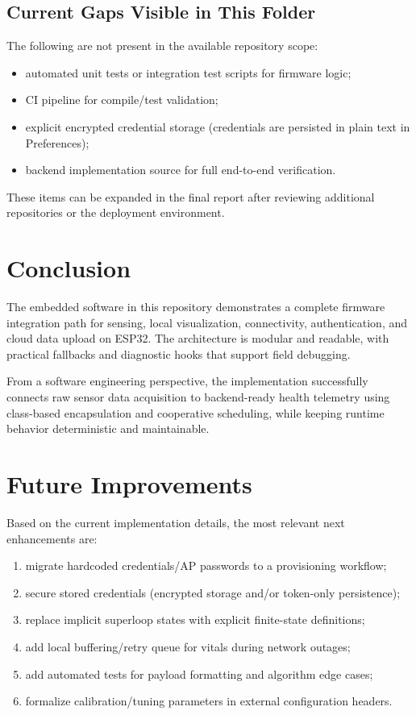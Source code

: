 \documentclass[12pt,a4paper]{report}
\begin{document}
\subsection{Current Gaps Visible in This Folder}
The following are not present in the available repository scope:
\begin{itemize}
  \item automated unit tests or integration test scripts for firmware logic;
  \item CI pipeline for compile/test validation;
  \item explicit encrypted credential storage (credentials are persisted in plain text in Preferences);
  \item backend implementation source for full end-to-end verification.
\end{itemize}

These items can be expanded in the final report after reviewing additional repositories or the deployment environment.

\section{Conclusion}
The embedded software in this repository demonstrates a complete firmware integration path for sensing, local visualization, connectivity, authentication, and cloud data upload on ESP32. The architecture is modular and readable, with practical fallbacks and diagnostic hooks that support field debugging.

From a software engineering perspective, the implementation successfully connects raw sensor data acquisition to backend-ready health telemetry using class-based encapsulation and cooperative scheduling, while keeping runtime behavior deterministic and maintainable.

\section{Future Improvements}
Based on the current implementation details, the most relevant next enhancements are:
\begin{enumerate}
  \item migrate hardcoded credentials/AP passwords to a provisioning workflow;
  \item secure stored credentials (encrypted storage and/or token-only persistence);
  \item replace implicit superloop states with explicit finite-state definitions;
  \item add local buffering/retry queue for vitals during network outages;
  \item add automated tests for payload formatting and algorithm edge cases;
  \item formalize calibration/tuning parameters in external configuration headers.
\end{enumerate}
\end{document}
